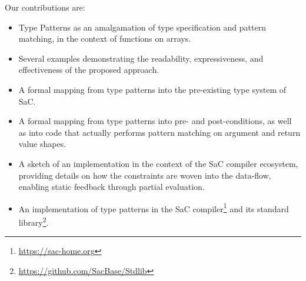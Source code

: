 Our contributions are:
\begin{itemize}
    \item Type Patterns as an amalgamation of type specification and pattern matching, in the context of functions on arrays.
    \item Several examples demonstrating the readability, expressiveness, and effectiveness of the proposed approach.
    \item A formal mapping from type patterns into the pre-existing type system of SaC.
    \item A formal mapping from type patterns into pre- and post-conditions, as well as into code that actually performs pattern matching on argument and return value shapes.
    \item A sketch of an implementation in the context of the SaC compiler ecosystem, providing details on how the constraints are woven into the data-flow, enabling static feedback through partial evaluation.
    \item An implementation of type patterns in the SaC compiler\footnote{\url{https://sac-home.org}} and its standard library\footnote{\url{https://github.com/SacBase/Stdlib}}.
\end{itemize}
